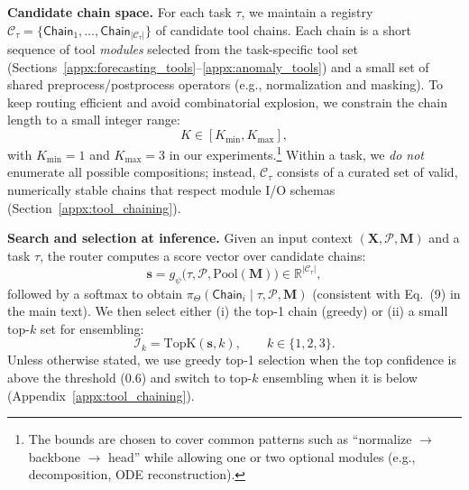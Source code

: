 \textbf{Candidate chain space.}
For each task $\tau$, we maintain a registry $\mathcal{C}_\tau=\{\mathsf{Chain}_1,\ldots,\mathsf{Chain}_{|\mathcal{C}_\tau|}\}$ of candidate tool chains.
Each chain is a short sequence of tool \emph{modules} selected from the task-specific tool set (Sections~\ref{appx:forecasting_tools}--\ref{appx:anomaly_tools}) and a small set of shared preprocess/postprocess operators (e.g., normalization and masking).
To keep routing efficient and avoid combinatorial explosion, we constrain the chain length to a small integer range:
\begin{equation}
K \in [K_{\min}, K_{\max}],
\end{equation}
with $K_{\min}=1$ and $K_{\max}=3$ in our experiments.\footnote{The bounds are chosen to cover common patterns such as ``normalize $\rightarrow$ backbone $\rightarrow$ head'' while allowing one or two optional modules (e.g., decomposition, ODE reconstruction).}
Within a task, we \emph{do not} enumerate all possible compositions; instead, $\mathcal{C}_\tau$ consists of a curated set of valid, numerically stable chains that respect module I/O schemas (Section~\ref{appx:tool_chaining}).

\textbf{Search and selection at inference.}
Given an input context $(\mathbf{X},\mathcal{P},\mathbf{M})$ and a task $\tau$, the router computes a score vector over candidate chains:
\begin{equation}
\mathbf{s} = g_{\psi}\big(\tau,\mathcal{P},\text{Pool}(\mathbf{M})\big)\in\mathbb{R}^{|\mathcal{C}_\tau|},
\end{equation}
followed by a softmax to obtain $\pi_{\Theta}(\mathsf{Chain}_i \mid \tau,\mathcal{P},\mathbf{M})$ (consistent with Eq.~(9) in the main text).
We then select either (i) the top-1 chain (greedy) or (ii) a small top-$k$ set for ensembling:
\begin{equation}
\mathcal{I}_k = \text{TopK}(\mathbf{s},k), \qquad k\in\{1,2,3\}.
\end{equation}
Unless otherwise stated, we use greedy top-1 selection when the top confidence is above the threshold (0.6) and switch to top-$k$ ensembling when it is below (Appendix~\ref{appx:tool_chaining}).


